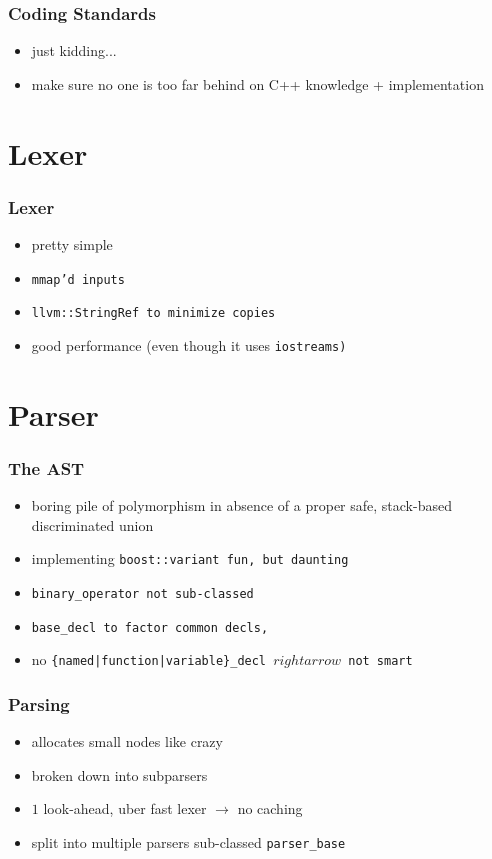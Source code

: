 \documentclass{beamer}
\begin{document}
\begin{frame}
  \frametitle{Coding Standards}
  \begin{itemize}
  \item<2-> just kidding...
  \item<3-> make sure no one is too far behind on C++ knowledge + implementation
  \end{itemize}
\end{frame}

\section{Lexer}

\begin{frame}
  \frametitle{Lexer}
  \begin{itemize}
  \item pretty simple
  \item \tt{mmap}'d inputs
  \item \tt{llvm::StringRef} to minimize copies
  \item good performance (even though it uses \tt{iostreams})
  \end{itemize}
\end{frame}

\section{Parser}
\begin{frame}
  \frametitle{The AST}
  \begin{itemize}
  \item boring pile of polymorphism in absence of a proper safe, stack-based discriminated union
  \item implementing \tt{boost::variant} fun, but daunting
  \item \tt{binary\_operator} not sub-classed
  \item \tt{base\_decl} to factor common decls, 
  \item no \tt{\{named|function|variable\}\_decl} $rightarrow$ not smart
  \end{itemize}
\end{frame}

\begin{frame}
  \frametitle{Parsing}
  \begin{itemize}
  \item allocates small nodes like crazy
  \item broken down into subparsers
  \item $1$ look-ahead, uber fast lexer $\rightarrow$ no caching
  \item split into multiple parsers sub-classed \tt{parser\_base}
  \end{itemize}
\end{frame}
\end{document}

